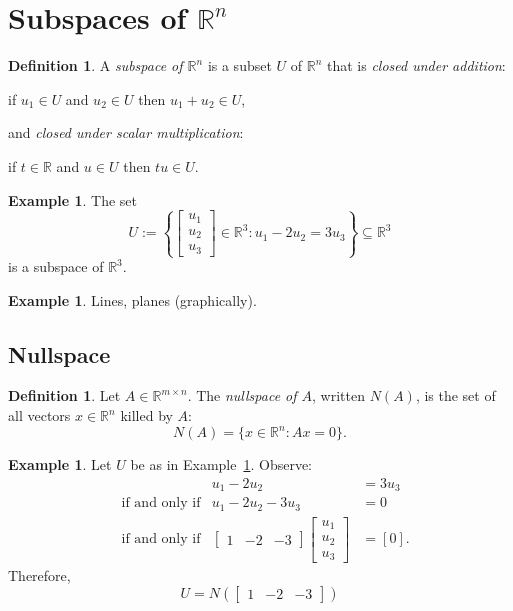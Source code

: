\documentclass{amsart}
\newcommand{\RR}{\mathbb{R}}
\theoremstyle{definition}
\newtheorem{definition}[theorem]{Definition}
\newtheorem{example}[theorem]{Example}
\begin{document}
\setlength{\parskip}{0.5em}
\setlength{\parindent}{0em}
\setlength{\itemsep}{0.5em}

\section{Subspaces of $\RR^n$}

\begin{definition}
A \emph{subspace of $\RR^n$} is a subset $U$ of $\RR^n$ that is \emph{closed under addition}:
\begin{center}
if $u_1\in U$ and $u_2\in U$ then $u_1+u_2\in U$,
\end{center}
and \emph{closed under scalar multiplication}:
\begin{center}
if $t\in \RR$ and $u\in U$ then $tu\in U$.
\end{center}
\end{definition}

\begin{example}\label{example:first_subspace} The set
$$U:=\left\{\begin{bmatrix}u_1\\u_2\\u_3\end{bmatrix}\in \RR^3 : u_1-2u_2=3u_3\right\}\subseteq \RR^3$$ is a subspace of $\RR^3$.
\end{example}

\begin{example}
  Lines, planes (graphically).
\end{example}

\subsection{Nullspace}
\begin{definition}
  Let $A\in\RR^{m\times n}$. The \emph{nullspace of $A$}, written $N(A)$, is the set of all vectors $x\in\RR^n$ killed by $A$:
  $$N(A) = \{x\in\RR^n : Ax=0\}.$$ 
\end{definition}

\begin{example} Let $U$ be as in Example~\ref{example:first_subspace}. Observe:
\begin{align*}
&&u_1-2u_2&=3u_3 \\
&\text{if and only if}& u_1-2u_2-3u_3&=0\\
&\text{if and only if}&\begin{bmatrix}1&-2&-3\end{bmatrix}
\begin{bmatrix}u_1\\u_2\\u_3\end{bmatrix}&=[0].
 \end{align*}
Therefore, $$U=N\left(\begin{bmatrix}1&-2&-3\end{bmatrix}\right)$$
\end{example}
\end{document}
